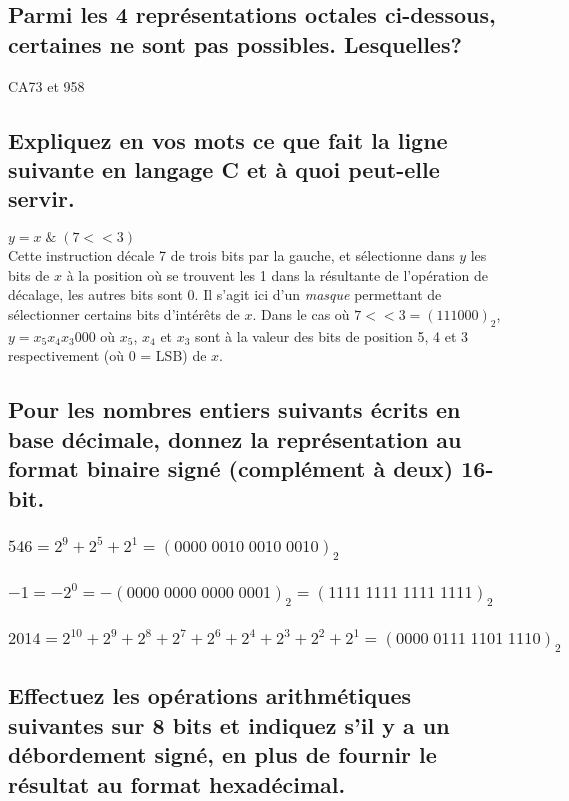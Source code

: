 \documentclass[10pt,letterpaper]{article}
\begin{document}
\subsection{Parmi les 4 représentations octales ci-dessous, certaines ne sont pas possibles. Lesquelles?}
CA73 et 958
\bigskip

\subsection{Expliquez en vos mots ce que fait la ligne suivante en langage C et à quoi peut-elle servir.}
\qquad $y = x\;\&\;(7 << 3)$ \\
\qquad Cette instruction décale 7 de trois bits par la gauche, et sélectionne dans $y$ les bits de $x$ à la position où se trouvent les 1 dans la résultante de l'opération de décalage, les autres bits sont 0. Il s'agit ici d'un \textit{masque} permettant de sélectionner certains bits d'intérêts de $x$. Dans le cas où $7 << 3 = (111000)_2$, $y = x_{5}x_{4}x_{3}000$ où $x_5$, $x_4$ et $x_3$ sont à la valeur des bits de position 5, 4 et 3 respectivement (où 0 = LSB) de $x$.
\bigskip

\subsection{Pour les nombres entiers suivants écrits en base décimale, donnez la représentation au format binaire signé (complément à deux) 16-bit.}
\subsubsection{$546 = 2^9 + 2^5 + 2^1 = (0000\;0010\;0010\;0010)_2$}

\subsubsection{$-1 = -2^0 = -(0000\;0000\;0000\;0001)_2 = (1111\;1111\;1111\;1111)_2$}

\subsubsection{$2014 = 2^{10} + 2^9 + 2^8 + 2^7 + 2^6 + 2^4 + 2^3 + 2^2 + 2^1 = (0000\;0111\;1101\;1110)_2$}
\bigskip

\subsection{Effectuez les opérations arithmétiques suivantes sur 8 bits et indiquez s'il y a un débordement signé, en plus de fournir le résultat au format hexadécimal.}
\end{document}
